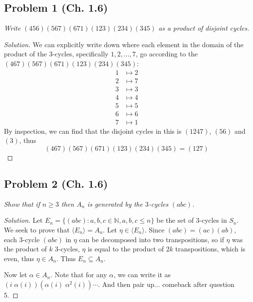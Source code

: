 \documentclass{article}
\newcommand{\N}{{\mathbb N}}
\begin{document}
\subsection*{Problem 1 (Ch. 1.6)}
{\it Write $(456)(567)(671)(123)(234)(345)$ as a product of disjoint cycles.}
\begin{proof}[Solution]\let\qed\relax
	We can explicitly write down where each element
	in the domain of the product of the $3$-cycles,
	specifically $1,2,\dots,7$,
	go according to the $(467)(567)(671)(123)(234)(345)$:
	\begin{align*}
		1 &\mapsto 2\\
		2 &\mapsto 7\\
		3 &\mapsto 3\\
		4 &\mapsto 4\\
		5 &\mapsto 5\\
		6 &\mapsto 6\\
		7 &\mapsto 1
	\end{align*}
	By inspection, we can find that the disjoint cycles in this is
	$(1247)$, $(56)$ and $(3)$, thus
	\[
		(467)(567)(671)(123)(234)(345) = (127)
	\]
\end{proof}

\subsection*{Problem 2 (Ch. 1.6)}
{\it Show that if $n \geq 3$ then $A_n$ is generated by the $3$-cycles $(abc)$.}
\begin{proof}[Solution]\let\qed\relax
	Let $E_n = \{(abc) \colon a,b,c\in \N, a,b,c \leq n\}$ be the set of $3$-cycles in $S_n$.
	We seek to prove that $\langle E_n\rangle = A_n$.
	Let $\eta \in \langle E_n\rangle$.
	Since $(abc) = (ac)(ab)$,
	each $3$-cycle $(abc)$ in $\eta$ can be decomposed into two transpositions,
	so if $\eta$ was the product of $k$ $3$-cycles,
	$\eta$ is equal to the product of $2k$ transpositions,
	which is even, thus $\eta \in A_n$.
	Thus $E_n \subseteq A_n$.
	
	Now let $\alpha \in A_n$.
	Note that for any $\alpha$,
	we can write it as $(i \; \alpha(i))(\alpha(i) \; \alpha^2(i)) \cdots$.
	And then pair up... comeback after question 5.
\end{proof}
\end{document}
